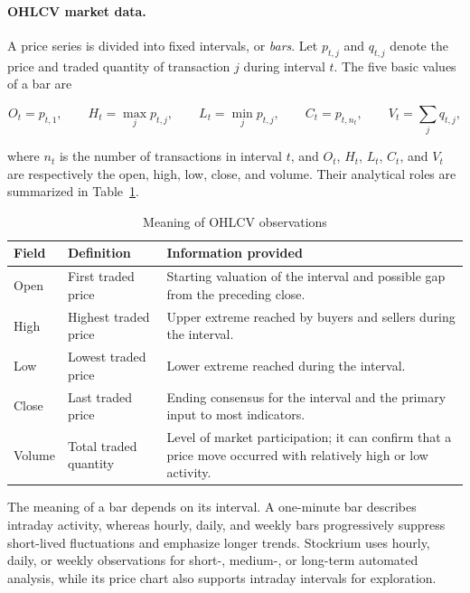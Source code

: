 \paragraph{OHLCV market data.}

A price series is divided into fixed intervals, or \textit{bars}. Let $p_{t,j}$ and $q_{t,j}$ denote the price and traded quantity of transaction $j$ during interval $t$. The five basic values of a bar are

\begin{equation}
    O_t=p_{t,1}, \qquad
    H_t=\max_j p_{t,j}, \qquad
    L_t=\min_j p_{t,j}, \qquad
    C_t=p_{t,n_t}, \qquad
    V_t=\sum_j q_{t,j},
    \label{eq:ohlcv-definition}
\end{equation}

where $n_t$ is the number of transactions in interval $t$, and $O_t$, $H_t$, $L_t$, $C_t$, and $V_t$ are respectively the open, high, low, close, and volume. Their analytical roles are summarized in Table~\ref{tab:ohlcv-meaning}.

\begin{table}[H]
    \centering
    \caption{Meaning of OHLCV observations}
    \label{tab:ohlcv-meaning}
    \begin{tabularx}{\textwidth}{@{}l l X@{}}
        \toprule
        Field & Definition & Information provided \\
        \midrule
        Open & First traded price & Starting valuation of the interval and possible gap from the preceding close. \\
        High & Highest traded price & Upper extreme reached by buyers and sellers during the interval. \\
        Low & Lowest traded price & Lower extreme reached during the interval. \\
        Close & Last traded price & Ending consensus for the interval and the primary input to most indicators. \\
        Volume & Total traded quantity & Level of market participation; it can confirm that a price move occurred with relatively high or low activity. \\
        \bottomrule
    \end{tabularx}
\end{table}

The meaning of a bar depends on its interval. A one-minute bar describes intraday activity, whereas hourly, daily, and weekly bars progressively suppress short-lived fluctuations and emphasize longer trends. Stockrium uses hourly, daily, or weekly observations for short-, medium-, or long-term automated analysis, while its price chart also supports intraday intervals for exploration.


